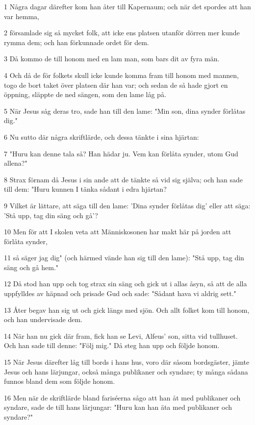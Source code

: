 \par 1 Några dagar därefter kom han åter till Kapernaum; och när det spordes att han var hemma,
\par 2 församlade sig så mycket folk, att icke ens platsen utanför dörren mer kunde rymma dem; och han förkunnade ordet för dem.
\par 3 Då kommo de till honom med en lam man, som bars dit av fyra män.
\par 4 Och då de för folkets skull icke kunde komma fram till honom med mannen, togo de bort taket över platsen där han var; och sedan de så hade gjort en öppning, släppte de ned sängen, som den lame låg på.
\par 5 När Jesus såg deras tro, sade han till den lame: "Min son, dina synder förlåtas dig."
\par 6 Nu sutto där några skriftlärde, och dessa tänkte i sina hjärtan:
\par 7 "Huru kan denne tala så? Han hädar ju. Vem kan förlåta synder, utom Gud allena?"
\par 8 Strax förnam då Jesus i sin ande att de tänkte så vid sig själva; och han sade till dem: "Huru kunnen I tänka sådant i edra hjärtan?
\par 9 Vilket är lättare, att säga till den lame: 'Dina synder förlåtas dig' eller att säga: 'Stå upp, tag din säng och gå'?
\par 10 Men för att I skolen veta att Människosonen har makt här på jorden att förlåta synder,
\par 11 så säger jag dig" (och härmed vände han sig till den lame): "Stå upp, tag din säng och gå hem."
\par 12 Då stod han upp och tog strax sin säng och gick ut i allas åsyn, så att de alla uppfylldes av häpnad och prisade Gud och sade: "Sådant hava vi aldrig sett."
\par 13 Åter begav han sig ut och gick längs med sjön. Och allt folket kom till honom, och han undervisade dem.
\par 14 När han nu gick där fram, fick han se Levi, Alfeus' son, sitta vid tullhuset. Och han sade till denne: "Följ mig." Då steg han upp och följde honom.
\par 15 När Jesus därefter låg till bords i hans hus, voro där såsom bordsgäster, jämte Jesus och hans lärjungar, också många publikaner och syndare; ty många sådana funnos bland dem som följde honom.
\par 16 Men när de skriftlärde bland fariséerna sågo att han åt med publikaner och syndare, sade de till hans lärjungar: "Huru kan han äta med publikaner och syndare?"
